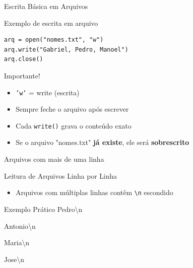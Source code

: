 \begin{frame}[fragile]{Escrita Básica em Arquivos}
\begin{block}{Exemplo de escrita em arquivo}
\begin{verbatim}
arq = open("nomes.txt", "w")
arq.write("Gabriel, Pedro, Manoel")
arq.close()
\end{verbatim}
\end{block}

\begin{block}{Importante!}
\begin{itemize}
\item \texttt{'w'} = write (escrita)
\item Sempre feche o arquivo após escrever
\item Cada \texttt{write()} grava o conteúdo exato
\item Se o arquivo "nomes.txt" \textbf{já existe}, ele será \textbf{sobrescrito}
\end{itemize}
\end{block}
\end{frame}

\begin{frame}[fragile]{Arquivos com mais de uma linha}

\begin{block}{Leitura de Arquivos Linha por Linha}
\begin{itemize}
    \item Arquivos com múltiplas linhas contêm \texttt{\textbackslash n} escondido

\end{itemize}
\end{block}

\begin{exampleblock}{Exemplo Prático}
Pedro\textbackslash n

Antonio\textbackslash n

Maria\textbackslash n

Jose\textbackslash n
\end{exampleblock}

\end{frame}

